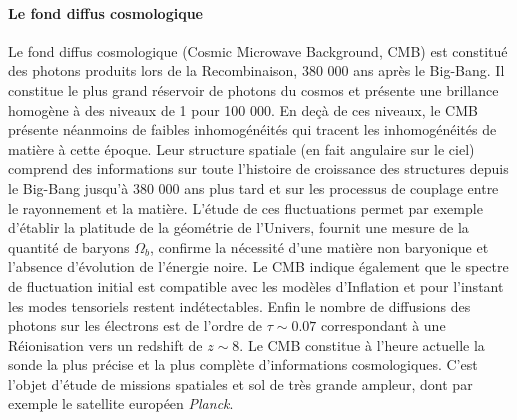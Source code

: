 \paragraph{Le fond diffus cosmologique}
Le fond diffus cosmologique (Cosmic Microwave Background, CMB) est constitué des photons produits lors de la Recombinaison, 380 000 ans après le Big-Bang. Il constitue le plus grand réservoir de photons du cosmos et présente une brillance homogène à des niveaux de 1 pour 100 000. En deçà de ces niveaux, le CMB présente néanmoins de faibles inhomogénéités qui tracent les inhomogénéités de matière à cette époque. Leur structure spatiale (en fait angulaire sur le ciel) comprend des informations sur toute l'histoire de croissance des structures depuis le Big-Bang jusqu'à 380 000 ans plus tard et sur les processus de couplage entre le rayonnement et la matière. L'étude de ces fluctuations permet par exemple d'établir la platitude de la géométrie de l'Univers, fournit une mesure de la quantité de baryons $\Omega_b$, confirme la nécessité d'une matière non baryonique et l'absence d'évolution de l'énergie noire. Le CMB indique également que le spectre de fluctuation initial est compatible avec les modèles d'Inflation  et pour l'instant les modes tensoriels restent indétectables. Enfin le nombre de diffusions  des photons sur les électrons est de l'ordre de $\tau\sim 0.07$ correspondant à une Réionisation vers un redshift de $z\sim8$. Le CMB constitue à l'heure actuelle la sonde la plus précise et la plus complète d'informations cosmologiques. C'est l'objet d'étude de missions spatiales et sol de très grande ampleur, dont par exemple le satellite européen \textit{Planck}.

